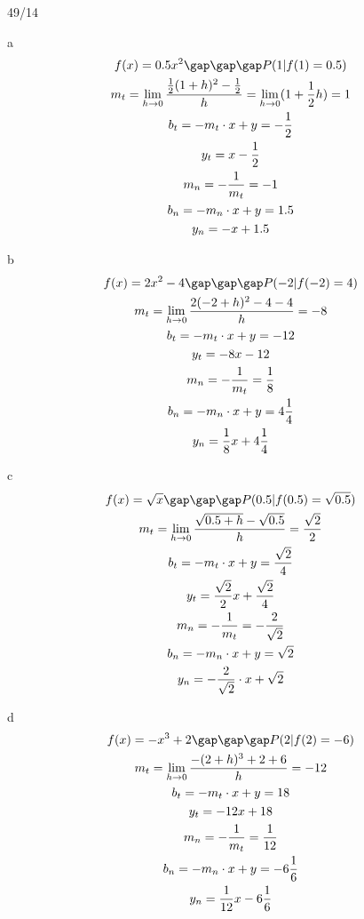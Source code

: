 \begin{exercise}{49/14}
  \item [a]
  \begin{gather*}
    f(x) = 0.5x^2\gap\gap\gap P(1|f(1) = 0.5) \\
    m_t = \lim\limits_{h \to 0} \frac{\frac{1}{2}(1 + h)^2 - \frac{1}{2}}{h} = \lim\limits_{h \to 0} (1 + \frac{1}{2}h) = 1 \\
    b_t = -m_t \cdot x + y = -\frac{1}{2} \\
    y_t = x - \frac{1}{2} \\
    m_n = -\frac{1}{m_t} = -1 \\
    b_n = -m_n \cdot x + y = 1.5 \\
    y_n = -x + 1.5
  \end{gather*}
  \item [b]
  \begin{gather*}
    f(x) = 2x^2 - 4\gap\gap\gap P(-2|f(-2) = 4) \\
    m_t = \lim\limits_{h \to 0} \frac{2(-2 + h)^2 - 4 - 4}{h} = -8 \\
    b_t = -m_t \cdot x + y = -12 \\
    y_t = -8x - 12 \\
    m_n = -\frac{1}{m_t} = \frac{1}{8} \\
    b_n = -m_n \cdot x + y = 4\frac{1}{4} \\
    y_n = \frac{1}{8}x + 4\frac{1}{4}
  \end{gather*}
  \item [c]
  \begin{gather*}
    f(x) = \sqrt{x}\gap\gap\gap P(0.5|f(0.5) = \sqrt{0.5}) \\
    m_t = \lim\limits_{h \to 0} \frac{\sqrt{0.5 + h} - \sqrt{0.5}}{h} = \frac{\sqrt{2}}{2} \\
    b_t = -m_t \cdot x + y = \frac{\sqrt{2}}{4} \\
    y_t = \frac{\sqrt{2}}{2}x + \frac{\sqrt{2}}{4} \\
    m_n = -\frac{1}{m_t} = -\frac{2}{\sqrt{2}} \\
    b_n = -m_n \cdot x + y = \sqrt{2} \\
    y_n = -\frac{2}{\sqrt{2}} \cdot x + \sqrt{2}
  \end{gather*}
  \item [d]
  \begin{gather*}
    f(x) = -x^3 + 2\gap\gap\gap P(2|f(2) = -6) \\
    m_t = \lim\limits_{h \to 0} \frac{-(2 + h)^3 + 2 + 6}{h} = -12 \\
    b_t = -m_t \cdot x + y = 18 \\
    y_t = -12x + 18 \\
    m_n = -\frac{1}{m_t} = \frac{1}{12} \\
    b_n = -m_n \cdot x + y = -6\frac{1}{6} \\
    y_n = \frac{1}{12}x - 6\frac{1}{6}
  \end{gather*}
\end{exercise}
